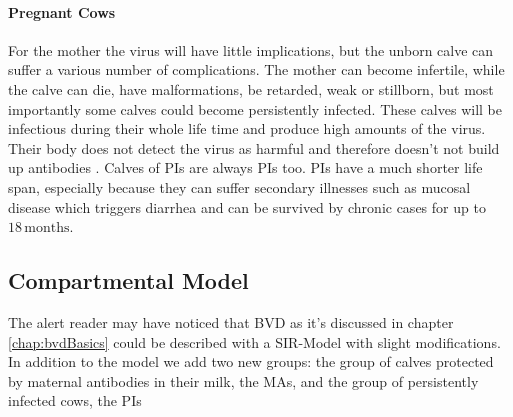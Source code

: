 \paragraph{Pregnant Cows}
For the mother the virus will have little implications, but the unborn calve can suffer a various number of complications. The mother can become infertile, while the calve can die, have malformations, be retarded, weak or stillborn, but most importantly some calves could become persistently infected. These calves will be infectious during their whole life time and produce high amounts of the virus. Their body does not detect the virus as harmful and therefore doesn't not build up antibodies \citep{personalCom}. Calves of PIs are always PIs too. PIs have a much shorter life span, especially because they can suffer secondary illnesses such as mucosal disease which triggers diarrhea and can be survived by chronic cases for up to $18\,\text{months}$.
\subsection{Compartmental Model}
The alert reader may have noticed that BVD as it's discussed in chapter \ref{chap:bvdBasics} could be described with a SIR-Model with slight modifications. In addition to the model we add two new groups: the group of calves protected by maternal antibodies in their milk, the MAs, and the group of persistently infected cows, the PIs